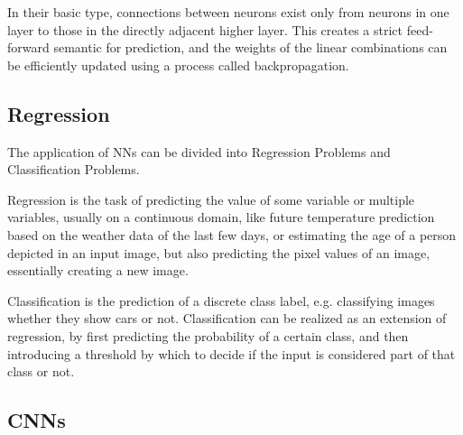 In their basic type, connections between neurons exist only from neurons in one layer to those in the directly adjacent higher layer. This creates a strict feed-forward semantic for prediction, and the weights of the linear combinations can be efficiently updated using a process called backpropagation.

\subsection{Regression}

The application of \glspl{NN} can be divided into Regression Problems and Classification Problems. 

Regression is the task of predicting the value of some variable or multiple variables, usually on a continuous domain, like future temperature prediction based on the weather data of the last few days, or estimating the age of a person depicted in an input image, but also predicting the pixel values of an image, essentially creating a new image.

Classification is the prediction of a discrete class label, e.g. classifying images whether they show cars or not. Classification can be realized as an extension of regression, by first predicting the probability of a certain class, and then introducing a threshold by which to decide if the input is considered part of that class or not.

\subsection{\glspl{CNN}}

